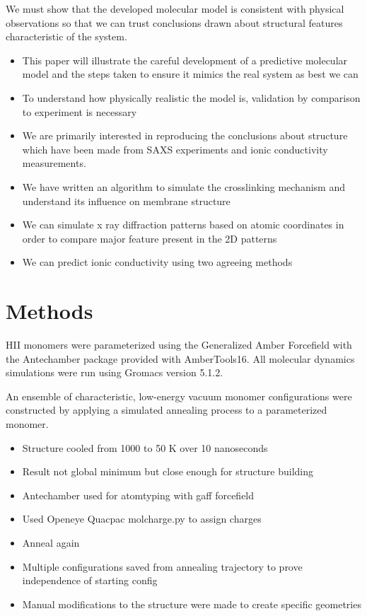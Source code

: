 \documentclass{article}
\begin{document}
\begin{itemize}
	We must show that the developed molecular model is consistent with physical observations so that we can trust conclusions drawn about structural features characteristic of the system.
	\begin{itemize}
		\item This paper will illustrate the careful development of a predictive molecular model and the steps taken to ensure it mimics the real system as best we can 
		\item To understand how physically realistic the model is, validation by comparison to experiment is necessary
		\item We are primarily interested in reproducing the conclusions about structure which have been made from SAXS experiments and ionic conductivity  measurements.    
		\item We have written an algorithm to simulate the crosslinking mechanism and understand its influence on membrane structure
		\item We can simulate x ray diffraction patterns based on atomic coordinates in order to compare major feature present in the 2D patterns
		\item We can predict ionic conductivity using two agreeing methods
	\end{itemize}
	
	\section{Methods}
	
	HII monomers were parameterized using the Generalized Amber Forcefield with the Antechamber package provided with AmberTools16. All molecular dynamics simulations were run using Gromacs version 5.1.2.
	
	An ensemble of characteristic, low-energy vacuum monomer configurations were constructed by applying a simulated annealing process to a parameterized monomer.
	\begin{itemize}
		\item Structure cooled from 1000 to 50 K over 10 nanoseconds
		\item Result not global minimum but close enough for structure building
		\item Antechamber used for atomtyping with gaff forcefield
		\item Used Openeye Quacpac molcharge.py to assign charges
		\item Anneal again 
		\item Multiple configurations saved from annealing trajectory to prove independence of starting config
		\item Manual modifications to the structure were made to create specific geometries
	\end{itemize}
	

\end{itemize}
\end{document}
